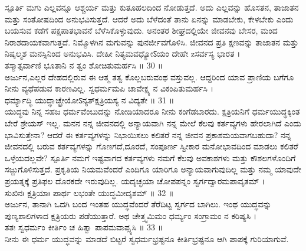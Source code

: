  ಸ್ಪೂರ್ತಿ 
 ಮಗು ಎಲ್ಲವನ್ನೂ ಆಶ್ಚರ್ಯ ಮತ್ತು ಕುತೂಹಲದಿಂದ ನೋಡುತ್ತದೆ. ಅದು ಎಲ್ಲವನ್ನು ಹೊಸತನ, ತಾಜಾತನ ಮತ್ತು ಸಂತೋಷದಿಂದ ಅನುಭವಿಸುತ್ತದೆ. ಆದರೆ ಅದು ಬೆಳೆದಂತೆ ತಾನು ಏನನ್ನು ಮಾಡಬೇಕು, ಕೇಳಬೇಕು ಎಂದು ಬಯಸುವ ಕಡೆಗೆ ಪಕ್ಷಪಾತಭಾವನೆ ಬೆಳೆಸಿಕೊಳ್ಳುವುದು. ಅನಂತರ ಶೀಘ್ರದಲ್ಲಿಯೇ ಜೀವನವು ಬೇಸರ, ಮಂದ ನಿರಾಶದಾಯಕವಾಗುತ್ತದೆ. ನಿಮ್ಮೊಳಗಿನ ಮಗುವನ್ನು ಪುನರ್ಜೀವಗೊಳಿಸಿ. ಜೀವನದ ಪ್ರತಿ ಕ್ಷಣವನ್ನು ತಾಜಾತನ ಮತ್ತು ನಿಷ್ಕಲ್ಮಶ ಮನಸ್ಸಿನಿಂದ ಅನುಭವಿಸಿ.
ದೇಹೀ ನಿತ್ಯಮವಧ್ಯೋऽಯಂ ದೇಹೇ zಸರ್ವಸ್ಯ ಭಾರತ ।\\
ತಸ್ಮಾತ್ಸರ್ವಾಣಿ ಭೂತಾನಿ ನ ತ್ವಂ ಶೋಚಿತುಮರ್ಹಸಿ ॥ 30 ॥\\
 ಅರ್ಜುನ,ಎಲ್ಲರ ದೇಹದಲ್ಲಿರುವ ಈ ಆತ್ಮ ತತ್ವ ಕೊಲ್ಲಬರುವಂಥ ವಸ್ತುವಲ್ಲ. ಆದ್ದರಿಂದ ಯಾವ ಪ್ರಾಣಿಯ ಬಗೆಗೂ ನೀನು ವ್ಯಥೆಪಡುವ ಕಾರಣವಿಲ್ಲ.
ಸ್ವಧರ್ಮಮಪಿ ಚಾವೇಕ್ಷ್ಯ ನ ವಿಕಂಪಿತುಮರ್ಹಸಿ ।\\
ಧರ್ಮ್ಯಾದ್ಧಿ ಯುದ್ಧಾಚ್ಛ್ರೇಯೋऽನ್ಯತ್ಕ್ಷತ್ರಿಯಸ್ಯ ನ ವಿದ್ಯತೇ ॥ 31 ॥\\
 ಯುದ್ಧವು ನಿನ್ನ ಸಹಜ ಧರ್ಮವೆಂಬುದನ್ನು ನೋಡಿಯಾದರೂ ನೀನು ಕಂಗೆಡಬಾರದು. ಕ್ಷತ್ರಿಯನಿಗೆ ಧರ್ಮಯುದ್ಧಕ್ಕಿಂತ ಬೇರೆ ಶ್ರೇಯಸ್ ಇಲ್ಲ.
ಮನನ 
 ನನ್ನ ಜೀವನದಲ್ಲಿ ಅನ್ಯಾಯವಾಗಿ ನನ್ನ ಮೇಲೆ ಕೆಲವು ಕರ್ತವ್ಯಗಳು ಹೇರಲಾಗಿದೆ ಎಂದು ಭಾವಿಸುತ್ತೇನಾ? ಆದರೆ ಈ ಕರ್ತವ್ಯಗಳನ್ನು ನಿಭಾಯಿಸಲು ಕಲಿತರೆ ನನ್ನ ಜೀವನ ಪ್ರಕಾಶಮಯವಾಗಬಹುದಾ? ನನ್ನ ಜೀವನದಲ್ಲಿ ಬರುವ ಕರ್ತವ್ಯಗಳನ್ನು ಗೊಣಗದೆ,ದೂರದೆ, ಸಂಪೂರ್ಣ ಸ್ವೀಕಾರ ಮನೋಭಾವದಿಂದ ಮಾಡಲು ಕಲಿತರೆ ಒಳ್ಳೆಯದಲ್ಲವೇ?
 ಸ್ಪೂರ್ತಿ 
 ನಮಗೆ ಇಷ್ಟವಾಗದ ಕರ್ತವ್ಯಗಳು ನಮಗೆ ಕೆಲವು ಅವಕಾಶಗಳು ಮತ್ತು ಕೌಶಲಗಳೊಂದಿಗೆ ಸಜ್ಜುಗೊಳಿಸುತ್ತದೆ. ಪ್ರಕೃತಿಯ ನಿಯಮವೆಂದರೆ ಎಂದಿಗೂ ಯಾರಿಗೂ ಅನ್ಯಾಯವಾಗುವುದಿಲ್ಲ ಮತ್ತು ನಮ್ಮ ಯಾವುದೇ ಪ್ರಯತ್ನಕ್ಕೆ ಪ್ರತಿಫಲ ದೊರಕದೇ ಇರುವುದಿಲ್ಲ.
ಯದೃಚ್ಛಯಾ ಚೋಪಪನ್ನಂ ಸ್ವರ್ಗದ್ವಾರಮಪಾವೃತಮ್ ।\\
ಸುಖಿನಃ ಕ್ಷತ್ರಿಯಾಃ ಪಾರ್ಥ ಲಭಂತೇ ಯುದ್ಧಮೀದೃಶಮ್ ॥ 32 ॥\\
 ಅರ್ಜುನ, ತಾನಾಗಿ ಒದಗಿ ಬಂದ ಇಂತಹ ಯುದ್ಧವೆಂದರೆ ತೆರೆದಿಟ್ಟ ಸ್ವರ್ಗದ ಬಾಗಿಲು. ಇಂಥ ಯುದ್ಧವನ್ನು ಪುಣ್ಯಶಾಲಿಗಳಾದ ಕ್ಷತ್ರಿಯರು ಪಡೆಯುತ್ತಾರೆ.
ಅಥ ಚೇತ್ತ್ವಮಿಮಂ ಧರ್ಮ್ಯಂ ಸಂಗ್ರಾಮಂ ನ ಕರಿಷ್ಯಸಿ ।\\
ತತಃ ಸ್ವಧರ್ಮಂ ಕೀರ್ತಿಂ ಚ ಹಿತ್ವಾ ಪಾಪಮವಾಪ್ಸ್ಯಸಿ ॥ 33 ॥\\
 ನೀನು ಈ ಧರ್ಮ ಯುದ್ಧವನ್ನು ಮಾಡದೆ ಬಿಟ್ಟರೆ ಸ್ವಧರ್ಮಭ್ರಷ್ಟನೂ ಕೀರ್ತಿಭ್ರಷ್ಟನೂ ಆಗಿ ಪಾಪಕ್ಕೆ ಗುರಿಯಾಗುವೆ.

